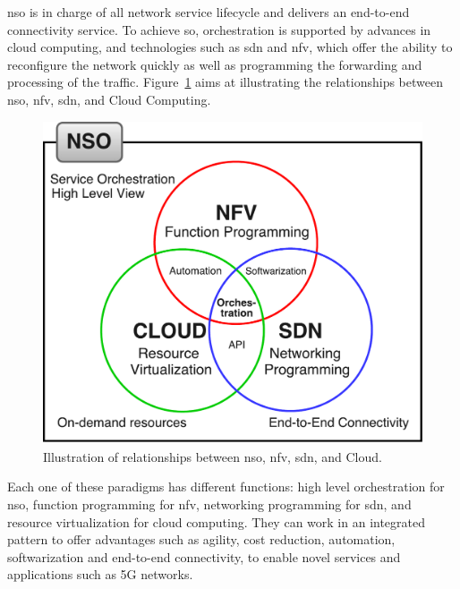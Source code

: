 \gls{nso} is in charge of all network service lifecycle and delivers an end-to-end connectivity service. To achieve so, orchestration is supported by advances in cloud computing, and technologies such as \gls{sdn} and \gls{nfv}, which offer the ability to reconfigure the network quickly as well as programming the forwarding and processing of the traffic. Figure~\ref{nso_rel} aims at illustrating the relationships between \gls{nso}, \gls{nfv}, \gls{sdn}, and Cloud Computing.

\begin{figure}[t]
  \centering
  \includegraphics[scale=.4]{Figures/03_NSO/nso_rel}
    \caption{Illustration of relationships between \gls{nso}, \gls{nfv}, \gls{sdn}, and Cloud.}
    \label{nso_rel}
\end{figure}

Each one of these paradigms has different functions: high level orchestration for \gls{nso}, function programming for \gls{nfv}, networking programming for \gls{sdn},  and resource virtualization for cloud computing. They can work in an integrated pattern to offer advantages such as agility, cost reduction, automation, softwarization and end-to-end connectivity, to enable novel services and applications such as 5G networks.

